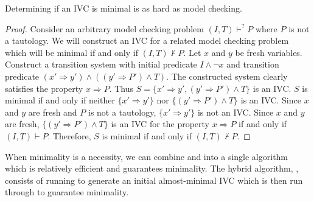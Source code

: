 \begin{theorem}
\label{thm:minimal-hard}
Determining if an IVC is minimal is as hard as model checking.
\end{theorem}
\begin{proof}
Consider an arbitrary model checking problem $(I, T)\vdash^? P$ where
$P$ is not a tautology. We will construct an IVC for a related model
checking problem which will be minimal if and only if $(I, T)\nvdash
P$. Let $x$ and $y$ be fresh variables. Construct a transition system
with initial predicate $I\land \neg x$ and transition predicate $(x'
\Rightarrow y') \land ((y' \Rightarrow P') \land T)$. The constructed
system clearly satisfies the property $x \Rightarrow P$. Thus $S = \{x'
\Rightarrow y', (y' \Rightarrow P') \land T\}$ is an IVC. $S$ is
minimal if and only if neither $\{x' \Rightarrow y'\}$ nor $\{(y'
\Rightarrow P') \land T\}$ is an IVC. Since $x$ and $y$ are fresh and
$P$ is not a tautology, $\{x' \Rightarrow y'\}$ is not an IVC. Since
$x$ and $y$ are fresh, $\{(y' \Rightarrow P') \land T\}$ is an IVC for
the property $x \Rightarrow P$ if and only if $(I, T)\vdash P$.
Therefore, $S$ is minimal if and only if $(I, T)\nvdash P$.
\end{proof}

When minimality is a necessity, we can combine \bfalg and \ucalg into
a single algorithm which is relatively efficient and guarantees
minimality. The hybrid algorithm, \ucbfalg, consists of running \ucalg
to generate an initial almost-minimal IVC which is then run through
\bfalg to guarantee minimality.


